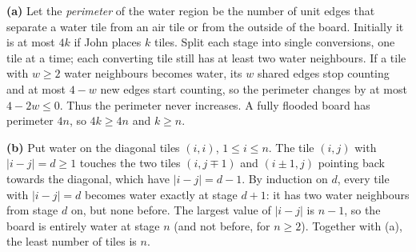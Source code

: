 \textbf{(a)} Let the \emph{perimeter} of the water region be the number of unit edges that separate a water tile from an air tile or from the outside of the board. Initially it is at most $4k$ if John places $k$ tiles. Split each stage into single conversions, one tile at a time; each converting tile still has at least two water neighbours. If a tile with $w\ge2$ water neighbours becomes water, its $w$ shared edges stop counting and at most $4-w$ new edges start counting, so the perimeter changes by at most $4-2w\le0$. Thus the perimeter never increases. A fully flooded board has perimeter $4n$, so $4k\ge4n$ and $k\ge n$.

\textbf{(b)} Put water on the diagonal tiles $(i,i)$, $1\le i\le n$. The tile $(i,j)$ with $|i-j|=d\ge1$ touches the two tiles $(i,j\mp1)$ and $(i\pm1,j)$ pointing back towards the diagonal, which have $|i-j|=d-1$. By induction on $d$, every tile with $|i-j|=d$ becomes water exactly at stage $d+1$: it has two water neighbours from stage $d$ on, but none before. The largest value of $|i-j|$ is $n-1$, so the board is entirely water at stage $\boxed{n}$ (and not before, for $n\ge2$). Together with (a), the least number of tiles is $\boxed{n}$.
